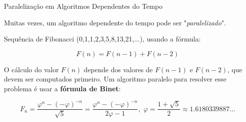 \documentclass{beamer}
\begin{document}
	\begin{frame}{Paralelização em Algoritmos Dependentes do Tempo}
		
		Muitas vezes, um algoritmo dependente do tempo  pode ser "\emph{paralelizado}".
		
		\vspace{0.2cm}
		 Sequência de Fibonacci (0,1,1,2,3,5,8,13,21,...),  usando a fórmula:
		
		\[
		F(n) = F(n-1) + F(n-2)
		\]
		
		O cálculo do valor \(F(n)\) depende dos valores de \(F(n-1)\) e \(F(n-2)\), que devem ser computados primeiro. Um algoritmo paralelo para resolver esse problema é usar a \textbf{fórmula de Binet}:
		
		\[
		F_n = \frac{\varphi^n - (-\varphi)^{-n}}{\sqrt{5}} = \frac{\varphi^n - (-\varphi)^{-n}}{2\varphi - 1},\,\,
		\varphi = \frac{1 + \sqrt{5}}{2} \approx 1.61803 39887\ldots
		\]
		
	\end{frame}
	
\end{document}
